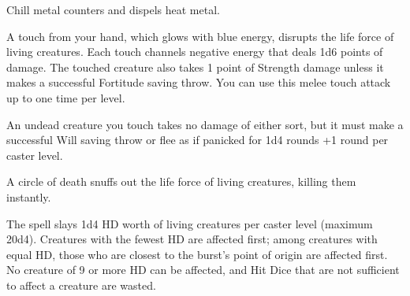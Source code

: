 \begin{multicols}{2}
\begin{small}
\smallskip\noindent Chill metal counters and dispels heat metal.

\noindent A touch from your hand, which glows with blue energy, disrupts the life force of living creatures. Each touch channels negative energy that deals 1d6 points of damage. The touched creature also takes 1 point of Strength damage unless it makes a successful Fortitude saving throw. You can use this melee touch attack up to one time per level.

\smallskip\noindent An undead creature you touch takes no damage of either sort, but it must make a successful Will saving throw or flee as if panicked for 1d4 rounds +1 round per caster level.

\noindent A circle of death snuffs out the life force of living creatures, killing them instantly.

\smallskip\noindent The spell slays 1d4 HD worth of living creatures per caster level (maximum 20d4). Creatures with the fewest HD are affected first; among creatures with equal HD, those who are closest to the burst's point of origin are affected first. No creature of 9 or more HD can be affected, and Hit Dice that are not sufficient to affect a creature are wasted.



\end{small}
\end{multicols}

